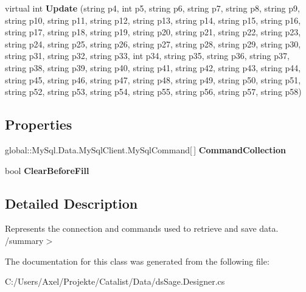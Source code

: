 \begin{DoxyCompactItemize}
\item 
virtual int {\bfseries Update} (string p4, int p5, string p6, string p7, string p8, string p9, string p10, string p11, string p12, string p13, string p14, string p15, string p16, string p17, string p18, string p19, string p20, string p21, string p22, string p23, string p24, string p25, string p26, string p27, string p28, string p29, string p30, string p31, string p32, string p33, int p34, string p35, string p36, string p37, string p38, string p39, string p40, string p41, string p42, string p43, string p44, string p45, string p46, string p47, string p48, string p49, string p50, string p51, string p52, string p53, string p54, string p55, string p56, string p57, string p58)\hypertarget{class_products_1_1_data_1_1ds_sage_table_adapters_1_1ta_kontakt_email_a2e2d13c398f1c5d0ddb7a392f7ae2727}{}\label{class_products_1_1_data_1_1ds_sage_table_adapters_1_1ta_kontakt_email_a2e2d13c398f1c5d0ddb7a392f7ae2727}

\end{DoxyCompactItemize}
\subsection*{Properties}
\begin{DoxyCompactItemize}
\item 
global\+::\+My\+Sql.\+Data.\+My\+Sql\+Client.\+My\+Sql\+Command\mbox{[}$\,$\mbox{]} {\bfseries Command\+Collection}\hypertarget{class_products_1_1_data_1_1ds_sage_table_adapters_1_1ta_kontakt_email_af469e8d34747674d4b4908121a3039a0}{}\label{class_products_1_1_data_1_1ds_sage_table_adapters_1_1ta_kontakt_email_af469e8d34747674d4b4908121a3039a0}

\item 
bool {\bfseries Clear\+Before\+Fill}\hypertarget{class_products_1_1_data_1_1ds_sage_table_adapters_1_1ta_kontakt_email_aac4fa8bbc05fc4575b0de1ce5a9c4bb2}{}\label{class_products_1_1_data_1_1ds_sage_table_adapters_1_1ta_kontakt_email_aac4fa8bbc05fc4575b0de1ce5a9c4bb2}

\end{DoxyCompactItemize}


\subsection{Detailed Description}
Represents the connection and commands used to retrieve and save data. /summary$>$ 

The documentation for this class was generated from the following file\+:\begin{DoxyCompactItemize}
\item 
C\+:/\+Users/\+Axel/\+Projekte/\+Catalist/\+Data/ds\+Sage.\+Designer.\+cs\end{DoxyCompactItemize}
